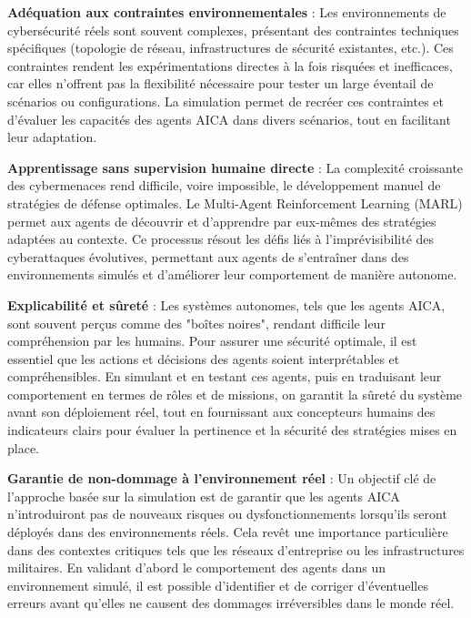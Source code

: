 \textbf{Adéquation aux contraintes environnementales} : Les environnements de cybersécurité réels sont souvent complexes, présentant des contraintes techniques spécifiques (topologie de réseau, infrastructures de sécurité existantes, etc.). Ces contraintes rendent les expérimentations directes à la fois risquées et inefficaces, car elles n'offrent pas la flexibilité nécessaire pour tester un large éventail de scénarios ou configurations. La simulation permet de recréer ces contraintes et d'évaluer les capacités des agents AICA dans divers scénarios, tout en facilitant leur adaptation.

\textbf{Apprentissage sans supervision humaine directe} : La complexité croissante des cybermenaces rend difficile, voire impossible, le développement manuel de stratégies de défense optimales. Le Multi-Agent Reinforcement Learning (MARL) permet aux agents de découvrir et d'apprendre par eux-mêmes des stratégies adaptées au contexte. Ce processus résout les défis liés à l'imprévisibilité des cyberattaques évolutives, permettant aux agents de s'entraîner dans des environnements simulés et d'améliorer leur comportement de manière autonome.

\textbf{Explicabilité et sûreté} : Les systèmes autonomes, tels que les agents AICA, sont souvent perçus comme des "boîtes noires", rendant difficile leur compréhension par les humains. Pour assurer une sécurité optimale, il est essentiel que les actions et décisions des agents soient interprétables et compréhensibles. En simulant et en testant ces agents, puis en traduisant leur comportement en termes de rôles et de missions, on garantit la sûreté du système avant son déploiement réel, tout en fournissant aux concepteurs humains des indicateurs clairs pour évaluer la pertinence et la sécurité des stratégies mises en place.

\textbf{Garantie de non-dommage à l'environnement réel} : Un objectif clé de l'approche basée sur la simulation est de garantir que les agents AICA n'introduiront pas de nouveaux risques ou dysfonctionnements lorsqu'ils seront déployés dans des environnements réels. Cela revêt une importance particulière dans des contextes critiques tels que les réseaux d'entreprise ou les infrastructures militaires. En validant d'abord le comportement des agents dans un environnement simulé, il est possible d'identifier et de corriger d'éventuelles erreurs avant qu'elles ne causent des dommages irréversibles dans le monde réel.

\vspace{0.5cm}

